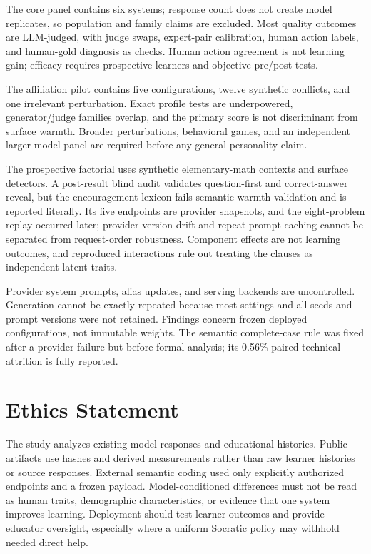 \documentclass[11pt]{article}
\begin{document}
The core panel contains six systems; response count does not create model
replicates, so population and family claims are excluded. Most quality outcomes
are LLM-judged, with judge swaps, expert-pair calibration, human action labels,
and human-gold diagnosis as checks. Human action agreement is not learning gain;
efficacy requires prospective learners and objective pre/post tests.

The affiliation pilot contains five configurations, twelve synthetic conflicts,
and one irrelevant perturbation. Exact profile tests are underpowered,
generator/judge families overlap, and the primary score is not discriminant from
surface warmth. Broader perturbations, behavioral games, and an independent
larger model panel are required before any general-personality claim.

The prospective factorial uses synthetic elementary-math contexts and surface
detectors. A post-result blind audit validates question-first and correct-answer
reveal, but the encouragement lexicon fails semantic warmth validation and is
reported literally. Its five endpoints are provider snapshots, and
the eight-problem replay occurred later; provider-version drift and repeat-prompt
caching cannot be separated from request-order robustness. Component effects are
not learning outcomes, and reproduced interactions rule out treating the clauses
as independent latent traits.

Provider system prompts, alias updates, and serving backends are uncontrolled.
Generation cannot be exactly repeated because most settings and all seeds and
prompt versions were not retained. Findings concern frozen deployed
configurations, not immutable weights. The semantic complete-case rule was fixed
after a provider failure but before formal analysis; its 0.56\% paired technical
attrition is fully reported.

\section*{Ethics Statement}

The study analyzes existing model responses and educational histories. Public
artifacts use hashes and derived measurements rather than raw learner histories
or source responses. External semantic coding used only explicitly authorized
endpoints and a frozen payload. Model-conditioned differences must not be read as
human traits, demographic characteristics, or evidence that one system improves
learning. Deployment should test learner outcomes and provide educator oversight,
especially where a uniform Socratic policy may withhold needed direct help.


\end{document}
